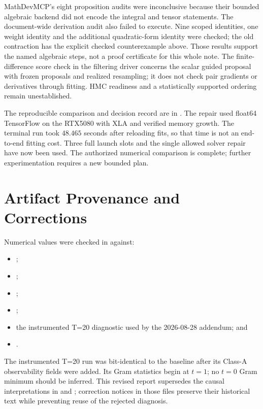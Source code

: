 \documentclass[11pt]{article}
\begin{document}
MathDevMCP's eight proposition audits were inconclusive because their bounded
algebraic backend did not encode the integral and tensor statements. The
document-wide derivation audit also failed to execute. Nine scoped identities,
one weight identity and the additional quadratic-form identity were checked;
the old contraction has the explicit checked counterexample above. Those
results support the named algebraic steps, not a proof certificate for this
whole note. The finite-difference score check in the filtering driver concerns
the scalar guided proposal with frozen proposals and realized resampling;
it does not check pair gradients or derivatives through fitting. HMC
readiness and a statistically supported ordering remain unestablished.

The reproducible comparison and decision record are in
{\def\UrlBreaks{\do\/\do\-\do\_}%
}.
The repair used float64 TensorFlow on the RTX5080 with XLA and verified
memory growth. The terminal run took $48.465$ seconds after reloading fits,
so that time is not an end-to-end fitting cost. Three full launch slots and
the single allowed solver repair have now been used. The authorized numerical
comparison is complete; further experimentation requires a new bounded plan.

\appendix
\section{Artifact Provenance and Corrections}

Numerical values were checked in
 against:
\begin{itemize}
\item {};
\item {};
\item {};
\item {};
\item the instrumented T=20 diagnostic used by the 2026-08-28 addendum; and
\item {}.
\end{itemize}

The instrumented T=20 run was bit-identical to the baseline after its Class-A
observability fields were added. Its Gram statistics begin at $t=1$; no $t=0$
Gram minimum should be inferred. This revised report supersedes the causal
interpretations in  and
; correction notices in
those files preserve their historical text while preventing reuse of the
rejected diagnosis.
\end{document}

